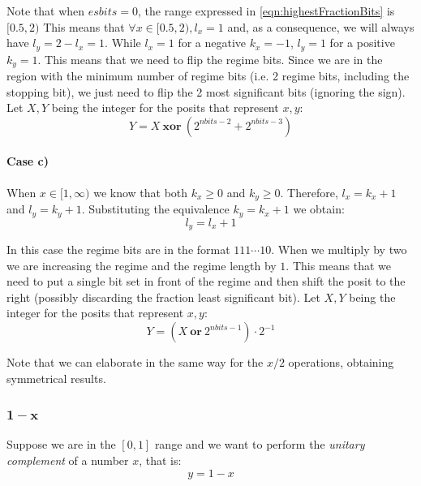 Note that when $esbits = 0$, the range expressed in \eqref{eqn:highestFractionBits} is $[0.5,2)$ This means that $\forall x \in [0.5,2), l_x = 1$ and, as a consequence, we will always have $l_y = 2 - l_x = 1$. While $l_x = 1$ for a negative $k_x = -1$, $l_y = 1$ for a positive $k_y = 1$. This means that we need to flip the regime bits. Since we are in the region with the minimum number of regime bits (i.e. 2 regime bits, including the stopping bit), we just need to flip the 2 most significant bits (ignoring the sign). Let $X,Y$ being the integer for the posits that represent $x,y$:
\begin{equation}
    Y = X\ \mathbf{xor}\ (2^{nbits - 2} + 2^{nbits - 3})
\end{equation}


\paragraph{Case c)} When $x \in [1,\infty)$ we know that both $k_x \geq 0$ and $k_y \geq 0$. Therefore, $l_x = k_x + 1$ and $l_y = k_y + 1$. Substituting the equivalence $k_y = k_x + 1$ we obtain:
\begin{equation}
    l_y = l_x + 1
\end{equation}

In this case the regime bits are in the format $111 \cdots 10$. When we multiply by two we are increasing the regime and the regime length by $1$. This means that we need to put a single bit set in front of the regime and then shift the posit to the right (possibly discarding the fraction least significant bit). Let $X,Y$ being the integer for the posits that represent $x,y$:
\begin{equation}
    Y = (X\ \mathbf{or}\ 2^{nbits - 1}) \cdot 2^{-1}
\end{equation}

Note that we can elaborate in the same way for the $x/2$ operations, obtaining symmetrical results.



\subsubsection{$\mathbf{1-x}$}

Suppose we are in the $[0,1]$ range and we want to perform the \textit{unitary complement} of a number $x$, that is:
\begin{equation}
    y = 1 - x    
\end{equation}

